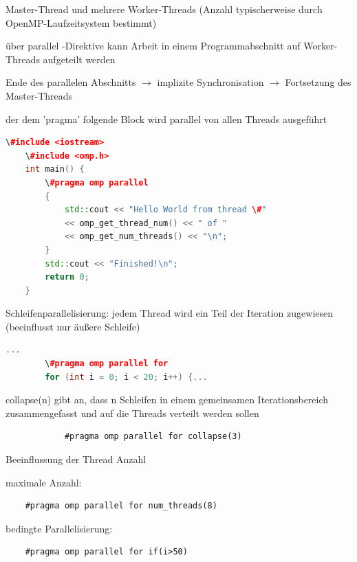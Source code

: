 \documentclass[10pt]{article}
\begin{document}
  
  \begin{itemize*}
    \item Master-Thread und mehrere Worker-Threads (Anzahl typischerweise durch OpenMP-Laufzeitsystem bestimmt)
    \item über parallel -Direktive kann Arbeit in einem Programmabschnitt auf Worker-Threads aufgeteilt werden
    \item Ende des parallelen Abschnitts $\rightarrow$ implizite Synchronisation $\rightarrow$ Fortsetzung des Master-Threads
    \item der dem 'pragma' folgende Block wird parallel von allen Threads ausgeführt
    \begin{lstlisting}[language=C++]
    \#include <iostream>
    \#include <omp.h>
    int main() {
        \#pragma omp parallel
        {
            std::cout << "Hello World from thread \#"
            << omp_get_thread_num() << " of "
            << omp_get_num_threads() << "\n";
        }
        std::cout << "Finished!\n";
        return 0;
    }
    \end{lstlisting}
    \item Schleifenparallelisierung: jedem Thread wird ein Teil der Iteration zugewiesen (beeinflusst nur äußere Schleife)
    \begin{lstlisting}[language=C++]
        ...
        \#pragma omp parallel for
        for (int i = 0; i < 20; i++) {...
    \end{lstlisting}
    \begin{itemize*}
      \item collapse(n) gibt an, dass n Schleifen in einem gemeinsamen Iterationsbereich zusammengefasst und auf die Threads verteilt werden sollen
      \begin{lstlisting}
            #pragma omp parallel for collapse(3)
        \end{lstlisting}
    \end{itemize*}
    \item Beeinflussung der Thread Anzahl
    \begin{itemize*}
      \item maximale Anzahl:
      \begin{lstlisting}
    #pragma omp parallel for num_threads(8)
\end{lstlisting}
      \item bedingte Parallelisierung:
      \begin{lstlisting}
    #pragma omp parallel for if(i>50)
\end{lstlisting}

\end{itemize*}
\end{itemize*}
\end{document}
